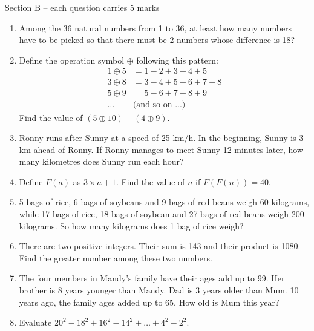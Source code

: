 \documentclass[11pt]{scrartcl}
\begin{document}
\newpage
Section B – each question carries 5 marks

\hrulefill %
\begin{enumerate}[resume]
    \item Among the 36 natural numbers from 1 to 36, at least how many numbers have to be picked so that there must be 2 numbers whose difference is 18?
    
    \vspace{10cm} \item Define the operation symbol $\oplus$ following this pattern:
    \begin{align*}
    1 \oplus 5 &= 1 - 2 + 3 - 4 + 5\\
    3 \oplus 8 &= 3 - 4 + 5 - 6 + 7 - 8\\
    5 \oplus 9 &= 5 - 6 + 7 - 8 + 9\\
    \dots& \text{(and so on ...)}
    \end{align*}
    Find the value of $(5 \oplus 10) - (4 \oplus 9).$
    
    \vspace{10cm} \item Ronny runs after Sunny at a speed of 25 km/h. In the beginning, Sunny is 3 km ahead of Ronny. If Ronny manages to meet Sunny 12 minutes later, how many kilometres does Sunny run each hour?
    
    \vspace{13cm} \item Define $F(a)$ as $3 \times a+1$. Find the value of $n$ if $F(F(n))=40$.
    
    \vspace{10cm} \item 5 bags of rice, 6 bags of soybeans and 9 bags of red beans weigh 60 kilograms, while 17 bags of rice, 18 bags of soybean and 27 bags of red beans weigh 200 kilograms. So how many kilograms does 1 bag of rice weigh?
    
    \vspace{10cm} \item There are two positive integers. Their sum is 143 and their product is 1080. Find the greater number among these two numbers.
    
    \vspace{10cm} \item The four members in Mandy's family have their ages add up to 99. Her brother is 8 years younger than Mandy. Dad is 3 years older than Mum. 10 years ago, the family ages added up to 65. How old is Mum this year?
    
    \vspace{10cm} \item Evaluate $20^2-18^2+16^2-14^2+\dots+4^2-2^2$.
\end{enumerate}
\end{document}
